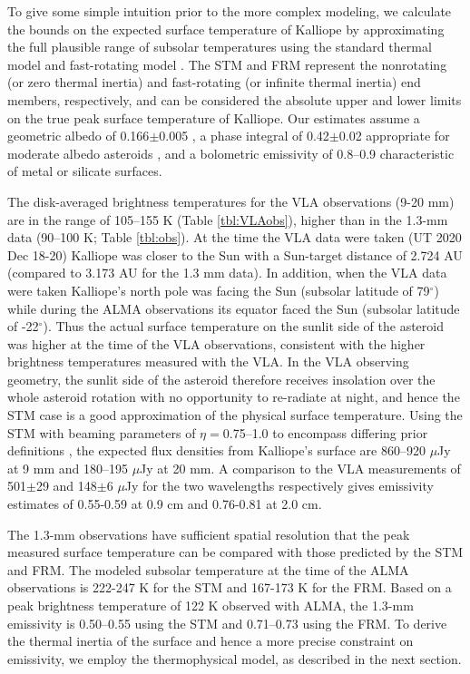 \documentclass[]{aastex631}
\begin{document}
To give some simple intuition prior to the more complex modeling, we calculate the bounds on the expected surface temperature of Kalliope by approximating the full plausible range of subsolar temperatures using the standard thermal model \citep[STM,][]{lebofsky1986}  and fast-rotating model \cite[FRM,][]{lebofsky1989}. The STM and FRM represent the nonrotating (or zero thermal inertia) and fast-rotating (or infinite thermal inertia) end members, respectively, and can be considered the absolute upper and lower limits on the true peak surface temperature of Kalliope. Our estimates assume a geometric albedo of 0.166$\pm$0.005 \citep{2019PDSSMainzer}, a phase integral of 0.42$\pm$0.02 appropriate for moderate albedo asteroids \citep{shevchenko2019}, and a bolometric emissivity of 0.8--0.9 characteristic of metal or silicate surfaces.

The disk-averaged brightness temperatures for the VLA observations (9-20 mm) are in the range of 105--155 K (Table \ref{tbl:VLAobs}), higher than in the 1.3-mm data (90--100 K; Table \ref{tbl:obs}). At the time the VLA data were taken (UT 2020 Dec 18-20) Kalliope was closer to the Sun with a Sun-target distance of 2.724 AU (compared to 3.173 AU for the 1.3 mm data). In addition, when the VLA data were taken Kalliope's north pole was facing the Sun (subsolar latitude of 79$^{\circ}$) while during the ALMA observations its equator faced the Sun (subsolar latitude of -22$^{\circ}$). Thus the actual surface temperature on the sunlit side of the asteroid was higher at the time of the VLA observations, consistent with the higher brightness temperatures measured with the VLA. In the VLA observing geometry, the sunlit side of the asteroid therefore receives insolation over the whole asteroid rotation with no opportunity to re-radiate at night, and hence the STM case is a good approximation of the physical surface temperature. Using the STM with beaming parameters of $\eta=$0.75--1.0 to encompass differing prior definitions \citep{lebofsky1986,lebofsky1989}, the expected flux densities from Kalliope's surface are 860--920 $\mu$Jy at 9 mm and 180--195 $\mu$Jy at 20 mm. A comparison to the VLA measurements of 501$\pm$29 and 148$\pm$6 $\mu$Jy for the two wavelengths respectively gives emissivity estimates of 0.55-0.59 at 0.9 cm and 0.76-0.81 at 2.0 cm.

The 1.3-mm observations have sufficient spatial resolution that the peak measured surface temperature can be compared with those predicted by the STM and FRM. The modeled subsolar temperature at the time of the ALMA observations is 222-247 K for the STM and 167-173 K for the FRM. Based on a peak brightness temperature of 122 K observed with ALMA, the 1.3-mm emissivity is 0.50--0.55 using the STM and 0.71--0.73 using the FRM. To derive the thermal inertia of the surface and hence a more precise constraint on emissivity, we employ the thermophysical model, as described in the next section.
\end{document}
